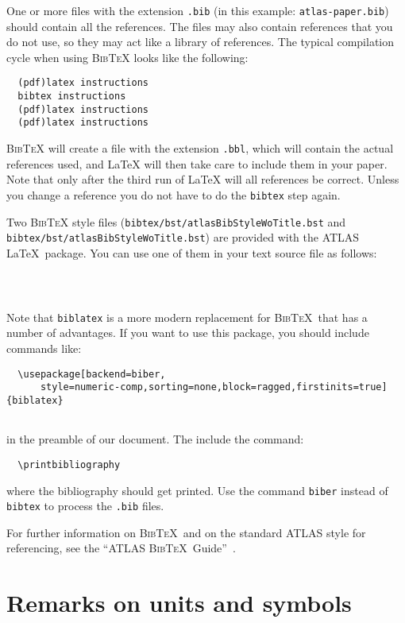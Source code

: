 \documentclass[UKenglish]{latex/atlasdoc}
\newcommand{\BibTeX}{\textsc{Bib\TeX}}
\begin{document}
One or more files with the extension \texttt{.bib} 
(in this example: \texttt{atlas-paper.bib}) should contain all the references. 
The files may also contain references that you do not use, so they may act like a
library of references. 
The typical compilation cycle when using \BibTeX{} looks like the following:
%
\begin{verbatim}
  (pdf)latex instructions
  bibtex instructions
  (pdf)latex instructions
  (pdf)latex instructions
\end{verbatim}
%
\BibTeX{} will create a file with the extension \texttt{.bbl}, which will
contain the actual references used, and \LaTeX{} will then take care
to include them in your paper. Note that only after the third run of
\LaTeX{} will all references be correct. Unless you change a reference
you do not have to do the \texttt{bibtex} step again.

Two \BibTeX{} style files 
(\texttt{bibtex/bst/atlasBibStyleWoTitle.bst} and \texttt{bibtex/bst/atlasBibStyleWoTitle.bst})
are provided with the ATLAS \LaTeX\ package. 
You can use one of them in your text source file as follows:
%
\begin{verbatim}
  
  
\end{verbatim}

Note that \texttt{biblatex} is a more modern replacement for \BibTeX\ that has a number of advantages.
If you want to use this package, you should include commands like:
%
\begin{verbatim}
  \usepackage[backend=biber,
	  style=numeric-comp,sorting=none,block=ragged,firstinits=true]{biblatex}
  
\end{verbatim}
%
in the preamble of our document.
The include the command:
%
\begin{verbatim}
  \printbibliography
\end{verbatim}
%
where the bibliography should get printed.
Use the command \texttt{biber} instead of \texttt{bibtex} to process the \texttt{.bib} files.

For further information on \BibTeX\ and on the standard ATLAS style for referencing, 
see the ``ATLAS \BibTeX\ Guide''~\cite{atlas-bibtex}.


\section{Remarks on units and symbols}
\label{sec:units}
\end{document}

